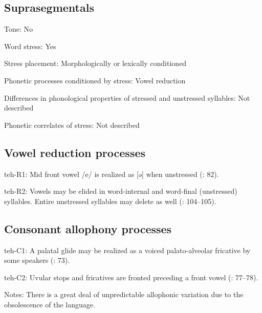 {\subsection*{Suprasegmentals}
\begin{appendixdesc}
\item[Tone:] No

\item[Word stress:] Yes

\item[Stress placement:] Morphologically or lexically conditioned

\item[Phonetic processes conditioned by stress:] Vowel reduction

\item[Differences in phonological properties of stressed and unstressed syllables:] Not described

\item[Phonetic correlates of stress:] Not described
\end{appendixdesc}
\subsection*{Vowel reduction processes}
\begin{appendixdesc}

\item[teh-R1:] Mid front vowel /e/ is realized as [ə] when unstressed (\citealt{FernándezGaray1998}: 82).

\item[teh-R2:] Vowels may be elided in word-internal and word-final (unstressed) syllables. Entire unstressed syllables may delete as well (\citealt{FernándezGaray1998}: 104--105).
\end{appendixdesc}
\subsection*{Consonant allophony processes}
\begin{appendixdesc}

\item[teh-C1:] A palatal glide may be realized as a voiced palato-alveolar fricative by some speakers (\citealt{FernándezGaray1998}: 73).

\item[teh-C2:] Uvular stops and fricatives are fronted preceding a front vowel (\citealt{FernándezGaray1998}: 77--78).

\item[Notes:] There is a great deal of unpredictable allophonic variation due to the obsolescence of the language.
\end{appendixdesc}
}
